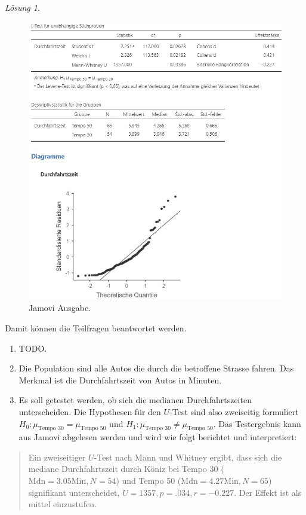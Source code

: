 \documentclass[
]{book}
\providecommand{\tightlist}{%
  \setlength{\itemsep}{0pt}\setlength{\parskip}{0pt}}
\theoremstyle{definition}
\theoremstyle{definition}
\theoremstyle{definition}
\theoremstyle{definition}
\theoremstyle{remark}
\newtheorem*{solution}{Lösung}
\begin{document}
\begin{solution}
\begin{figure}
\includegraphics[width=1\linewidth]{figures/07-exr-tempo30-jmv-output} \caption{Jamovi Ausgabe.}\label{fig:sol-tempo30-output}
\end{figure}

Damit können die Teilfragen beantwortet werden.

\begin{enumerate}
\def\labelenumi{\alph{enumi})}
\tightlist
\item
  TODO.
\item
  Die Population sind alle Autos die durch die betroffene Strasse fahren. Das Merkmal ist die Durchfahrtszeit von Autos in Minuten.
\item
  Es soll getestet werden, ob sich die medianen Durchfahrtszeiten unterscheiden. Die Hypothesen für den \(U\)-Test sind also zweiseitig formuliert \(H_0: \mu_\text{Tempo 30} = \mu_\text{Tempo 50}\) und \(H_1: \mu_\text{Tempo 30} \neq \mu_\text{Tempo 50}\). Das Testergebnis kann aus Jamovi abgelesen werden und wird wie folgt berichtet und interpretiert:
\end{enumerate}

\begin{quote}
Ein zweiseitiger \(U\)-Test nach Mann und Whitney ergibt, dass sich die mediane Durchfahrtszeit durch Köniz bei Tempo 30 (\(\text{Mdn}= 3.05 \text{Min}, N =54\)) und Tempo 50 (\(\text{Mdn}=4.27 \text{Min}, N = 65\)) signifikant unterscheidet, \(U = 1357, p = .034, r = -0.227\). Der Effekt ist als mittel einzustufen.
\end{quote}

\end{solution}
\end{document}
